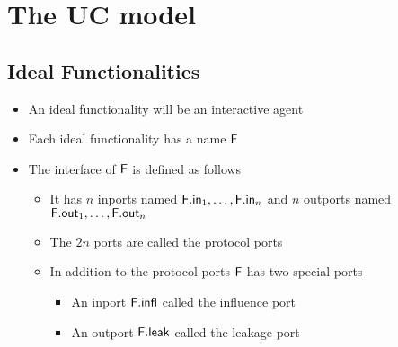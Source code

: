 \section{The UC model}
\subsection{Ideal Functionalities}
\begin{itemize}
  \item An ideal functionality will be an interactive agent
  \item Each ideal functionality has a name $\mathsf{F}$
  \item The interface of $\mathsf{F}$ is defined as follows
  \begin{itemize}
  	\item It has $n$ inports named $\mathsf{F}.\mathsf{in}_1, \dots, \mathsf{F}.\mathsf{in}_n$ and $n$ outports named $\mathsf{F}.\mathsf{out}_1, \dots, \mathsf{F}.\mathsf{out}_n$
  	\item The $2n$ ports are called the protocol ports
  	\item In addition to the protocol ports $\mathsf{F}$ has two special ports
    \begin{itemize}
  		\item An inport $\mathsf{F}.\mathsf{infl}$ called the influence port
  		\item An outport $\mathsf{F}.\mathsf{leak}$ called the leakage port
    \end{itemize}
  \end{itemize}
\end{itemize}

